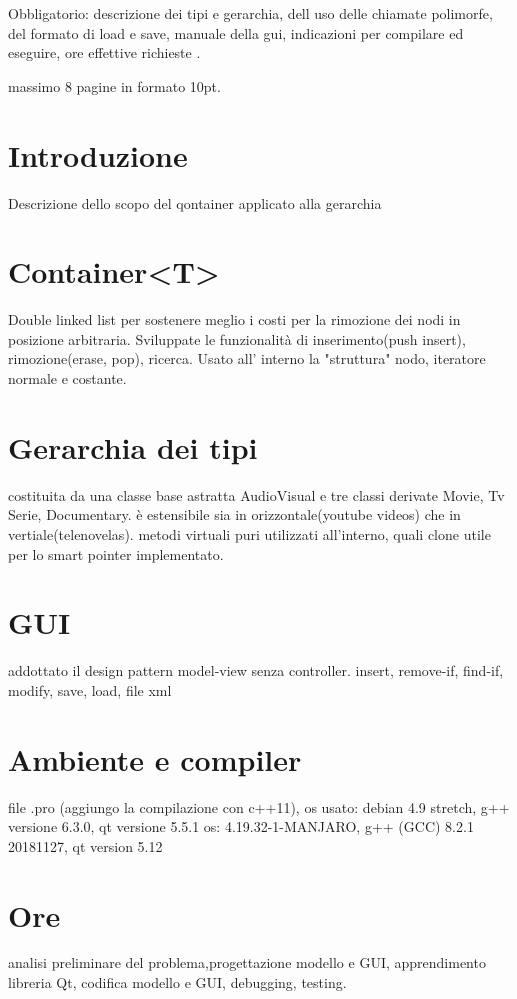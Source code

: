 


    Obbligatorio: descrizione dei tipi e gerarchia, dell uso delle chiamate polimorfe, del formato di load e save, manuale della gui, indicazioni per compilare ed eseguire, ore effettive richieste .

    massimo 8 pagine in formato 10pt.
    \section{Introduzione}
        Descrizione dello scopo del qontainer applicato alla gerarchia

    \section{Container<T>}
        Double linked list per sostenere meglio i costi per la rimozione dei nodi in posizione arbitraria. Sviluppate le funzionalità di inserimento(push insert), rimozione(erase, pop), ricerca. Usato all' interno la "struttura" nodo, iteratore normale e costante. 

    \section{Gerarchia dei tipi}
        
        costituita da una classe base astratta AudioVisual e tre classi derivate Movie, Tv Serie, Documentary. è estensibile sia in orizzontale(youtube videos) che in vertiale(telenovelas). metodi virtuali puri utilizzati all'interno, quali clone utile per lo smart pointer implementato. 

    \section{GUI}
        addottato il design pattern model-view senza controller. 
        insert, remove-if, find-if, modify, save, load, file xml

    \section{Ambiente e compiler}
        file .pro (aggiungo la compilazione con c++11), os usato: debian 4.9 stretch, g++ versione 6.3.0, qt versione 5.5.1
        os: 4.19.32-1-MANJARO, g++ (GCC) 8.2.1 20181127, qt version 5.12

    \section{Ore}
        analisi preliminare del problema,progettazione
        modello e GUI, apprendimento libreria Qt, codifica modello e GUI, debugging, testing.

